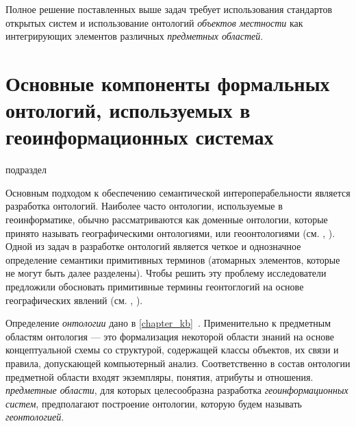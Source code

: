 Полное решение поставленных выше задач требует использования стандартов открытых систем и использование онтологий \textit{объектов местности} как интегрирующих элементов различных \textit{предметных областей}.

\section{Основные компоненты формальных онтологий, используемых в геоинформационных системах}
\label{chapter_gis_sec_components}

\begin{SCn}	
\begin{scnrelfromlist}{подраздел}
\end{scnrelfromlist}
\end{SCn}

Основным подходом к обеспечению семантической интероперабельности является разработка онтологий.
Наиболее часто онтологии, используемые в геоинформатике, обычно рассматриваются как доменные онтологии, которые принято называть географическими онтологиями, или геоонтологиями (см. , ). Одной из задач в разработке онтологий является четкое и однозначное определение семантики примитивных терминов (атомарных элементов, которые не могут быть далее разделены). Чтобы решить эту проблему исследователи предложили обосновать примитивные термины геонтоглогий на основе географических явлений (см. , ).

Определение \textit{онтологии} дано в \ref{chapter_kb}~. Применительно к предметным областям онтология --- это формализация некоторой области знаний на основе концептуальной схемы со структурой, содержащей классы объектов, их связи и правила, допускающей компьютерный анализ. Соответственно в состав онтологии предметной области входят экземпляры, понятия, атрибуты и отношения. 
\textit{предметные области}, для которых целесообразна разработка \textit{геоинформационных систем}, предполагают построение онтологии, которую будем называть \textit{геонтологией}.

\begin{SCn}
\end{SCn}

